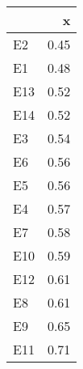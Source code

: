 
\begin{tabular}[t]{l|r}
\hline
  & x\\
\hline
E2 & 0.45\\
\hline
E1 & 0.48\\
\hline
E13 & 0.52\\
\hline
E14 & 0.52\\
\hline
E3 & 0.54\\
\hline
E6 & 0.56\\
\hline
E5 & 0.56\\
\hline
E4 & 0.57\\
\hline
E7 & 0.58\\
\hline
E10 & 0.59\\
\hline
E12 & 0.61\\
\hline
E8 & 0.61\\
\hline
E9 & 0.65\\
\hline
E11 & 0.71\\
\hline
\end{tabular}

